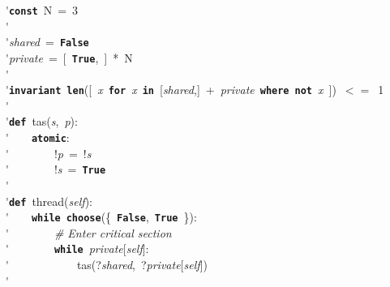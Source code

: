\'\>\texttt{\textbf{const}}~N~=~3\\

\'\>\\

\'\>\textit{shared}~=~\texttt{\textbf{False}}\\

\'\>\textit{private}~=~[~\texttt{\textbf{True}},~]~*~N\\

\'\>\\

\'\>\texttt{\textbf{invariant}}~\texttt{\textbf{len}}([~\textit{x}~\texttt{\textbf{for}}~\textit{x}~\texttt{\textbf{in}}~[\textit{shared},]~+~\textit{private}~\texttt{\textbf{where}}~\texttt{\textbf{not}}~\textit{x}~])~$<=$~1\\

\'\>\\

\'\>\texttt{\textbf{def}}~tas(\textit{s},~\textit{p}):\\

\'\>~~~~\texttt{\textbf{atomic}}:\\

\'\>~~~~~~~~!\textit{p}~=~!\textit{s}\\

\'\>~~~~~~~~!\textit{s}~=~\texttt{\textbf{True}}\\

\'\>\\

\'\>\texttt{\textbf{def}}~thread(\textit{self}):\\

\'\>~~~~\texttt{\textbf{while}}~\texttt{\textbf{choose}}(\{~\texttt{\textbf{False}},~\texttt{\textbf{True}}~\}):\\

\'\>~~~~~~~~\emph{\# Enter critical section}\\

\'\>~~~~~~~~\texttt{\textbf{while}}~\textit{private}[\textit{self}]:\\

\'\>~~~~~~~~~~~~tas(?\textit{shared},~?\textit{private}[\textit{self}])\\

\'\>\\

